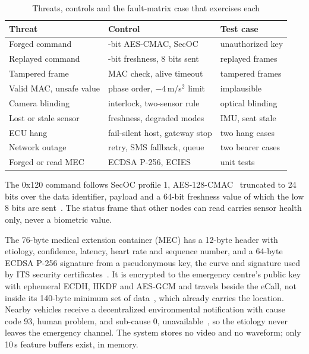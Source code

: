 \documentclass[conference]{IEEEtran}
\begin{document}
\begin{table}[!t]
\caption{Threats, controls and the fault-matrix case that exercises each}
\label{tab:threats}
\centering
\footnotesize
\begin{tabular}{@{}>{\raggedright\arraybackslash}p{2.6cm}>{\raggedright\arraybackslash}p{3.4cm}>{\raggedright\arraybackslash}p{2.0cm}@{}}
\toprule
Threat & Control & Test case \\
\midrule
Forged command & 24-bit AES-CMAC, SecOC & unauthorized key \\
Replayed command & 64-bit freshness, 8 bits sent & replayed frames \\
Tampered frame & MAC check, alive timeout & tampered frames \\
Valid MAC, unsafe value & phase order, $-4$\,m/s$^2$ limit & implausible \\
Camera blinding & interlock, two-sensor rule & optical blinding \\
Lost or stale sensor & freshness, degraded modes & IMU, seat stale \\
ECU hang & fail-silent host, gateway stop & two hang cases \\
Network outage & retry, SMS fallback, queue & two bearer cases \\
Forged or read MEC & ECDSA P-256, ECIES & unit tests \\
\bottomrule
\end{tabular}
\end{table}

The 0x120 command follows SecOC profile 1, AES-128-CMAC~\cite{nist80038b} truncated to 24 bits over the data identifier, payload and a 64-bit freshness value of which the low 8 bits are sent~\cite{autosar_secoc}. The status frame that other nodes can read carries sensor health only, never a biometric value.

The 76-byte medical extension container (MEC) has a 12-byte header with etiology, confidence, latency, heart rate and sequence number, and a 64-byte ECDSA P-256 signature from a pseudonymous key, the curve and signature used by ITS security certificates~\cite{etsi103097}. It is encrypted to the emergency centre's public key with ephemeral ECDH, HKDF and AES-GCM and travels beside the eCall, not inside its 140-byte minimum set of data~\cite{en15722}, which already carries the location. Nearby vehicles receive a decentralized environmental notification with cause code 93, human problem, and sub-cause 0, unavailable~\cite{etsi102894}, so the etiology never leaves the emergency channel. The system stores no video and no waveform; only 10\,s feature buffers exist, in memory.
\end{document}

